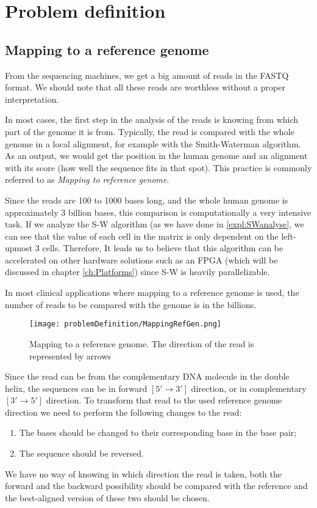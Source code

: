 \section{Problem definition}

\subsection{Mapping to a reference genome}

From the sequencing machines, we get a big amount of reads in the FASTQ format. We should note that all these reads are worthless without a proper interpretation.

In most cases, the first step in the analysis of the reads is knowing from which part of the genome it is from. Typically, the read is compared with the whole genome in a local alignment, for example with the Smith-Waterman algorithm. As an output, we would get the position in the human genome and an alignment with its score (how well the sequence fits in that spot). This practice is commonly referred to as \emph{Mapping to reference genome}.

Since the reads are 100 to 1000 bases long, and the whole human genome is approximately 3 billion bases, this comparison is computationally a very intensive task. If we analyze the S-W algorithm (as we have done in \ref{expl:SWanalyse}, we can see that the value of each cell in the matrix is only dependent on the left-upmost 3 cells. Therefore, It leads us to believe that this algorithm can be accelerated on other hardware solutions such as an FPGA (which will be discussed in chapter \ref{ch:Platforms}) since S-W is heavily parallelizable.

In most clinical applications where mapping to a reference genome is used, the number of reads to be compared with the genome is in the billions.

\begin{figure}[H]
	\centering
	\texttt{[image: problemDefinition/MappingRefGen.png]}
	\caption{Mapping to a reference genome. The direction of the read is represented by arrows}
	\label{fig:mapRefGen}
\end{figure}

Since the read can be from the complementary DNA molecule in the double helix, the sequences can be in forward $[5' \rightarrow 3']$ direction, or in complementary $[3' \rightarrow 5']$ direction. To transform that read to the used reference genome direction we need to perform the following changes to the read:
\begin{enumerate}
	\item The bases should be changed to their corresponding base in the base pair;
	\item The sequence should be reversed.
\end{enumerate}
We have no way of knowing in which direction the read is taken, both the forward and the backward possibility should be compared with the reference and the best-aligned version of these two should be chosen.

